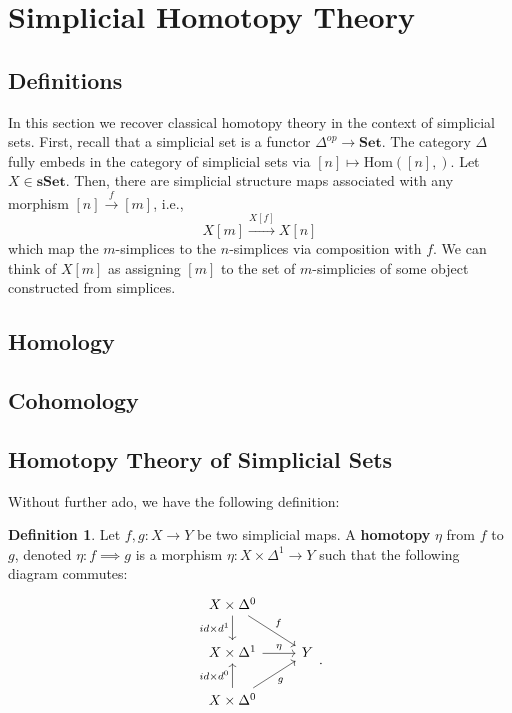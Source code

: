\documentclass{article}
\theoremstyle{definition}
\newtheorem{defn}{Definition}[section]
\newcommand{\cat}{\mathbf}
\newcommand{\Hom}{\text{Hom}}
\begin{document}
    \section{Simplicial Homotopy Theory}
    \subsection{Definitions}
    In this section we recover classical homotopy theory in the context of simplicial sets. First, recall that a simplicial set is a functor $\Delta^{op}\rightarrow \cat{Set}$. The category $\Delta$ fully embeds in the category of simplicial sets via $[n]\mapsto \Hom([n], )$. Let $X\in\cat{sSet}$. Then, there are simplicial structure maps associated with any morphism $[n]\xrightarrow{f} [m]$, i.e., 
    \[X[m]\xrightarrow{X[f]} X[n] \] which map the $m$-simplices to the $n$-simplices via composition with $f$. We can think of $X[m]$ as assigning $[m]$ to the set of $m$-simplicies of some object constructed from simplices.
    \subsection{Homology}
    \subsection{Cohomology}
    \subsection{Homotopy Theory of Simplicial Sets}
    Without further ado, we have the following definition:
    \begin{defn}
    Let $f,g:X\rightarrow Y$ be two simplicial maps. A \textbf{homotopy} $\eta$ from $f$ to $g$, denoted $\eta:f\implies g$ is a morphism $\eta:X\times\Delta^{1}\rightarrow Y$ such that the following diagram commutes:
     \[
    \begin{tikzcd}
    X\times\Delta^{0}\arrow[d,"id\times d^{1}"']\arrow[dr,"f"]\\
    X\times\Delta^{1}\arrow[r,"\eta"]	& Y\\
    X\times\Delta^{0}\arrow[u,"id\times d^{0}"]\arrow[ur,"g"']\\
    \end{tikzcd}.
    \]
    \end{defn}
    
\end{document}
